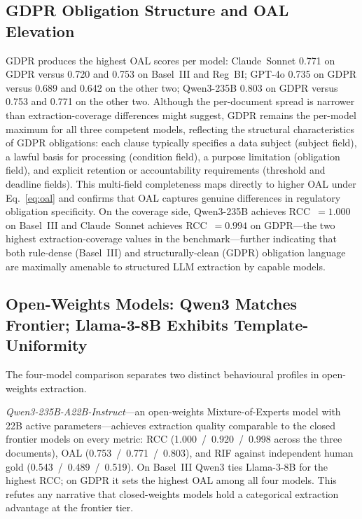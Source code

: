 \documentclass{article}
\begin{document}
\subsection{GDPR Obligation Structure and OAL Elevation}

GDPR produces the highest OAL scores per model:
Claude~Sonnet 0.771 on GDPR versus 0.720 and 0.753 on Basel~III and
Reg~BI; GPT-4o 0.735 on GDPR versus 0.689 and 0.642 on the other two;
Qwen3-235B 0.803 on GDPR versus 0.753 and 0.771 on the other two.
Although the per-document spread is narrower than extraction-coverage
differences might suggest, GDPR remains the per-model maximum for all
three competent models, reflecting the structural characteristics of
GDPR obligations: each clause typically specifies a data subject
(subject field), a lawful basis for processing (condition field), a
purpose limitation (obligation field), and explicit retention or
accountability requirements (threshold and deadline fields).
This multi-field completeness maps directly to higher OAL under
Eq.~\ref{eq:oal} and confirms that OAL captures genuine differences
in regulatory obligation specificity.
On the coverage side, Qwen3-235B achieves RCC~$= 1.000$ on Basel~III
and Claude~Sonnet achieves RCC~$= 0.994$ on GDPR---the two highest
extraction-coverage values in the benchmark---further indicating that
both rule-dense (Basel~III) and structurally-clean (GDPR)
obligation language are maximally amenable to structured LLM
extraction by capable models.

\subsection{Open-Weights Models: Qwen3 Matches Frontier;
Llama-3-8B Exhibits Template-Uniformity}
\label{sec:openweight}

The four-model comparison separates two distinct behavioural
profiles in open-weights extraction.

\emph{Qwen3-235B-A22B-Instruct}---an open-weights Mixture-of-Experts
model with 22B active parameters---achieves extraction quality
comparable to the closed frontier models on every metric: RCC
(1.000~/~0.920~/~0.998 across the three documents), OAL
(0.753~/~0.771~/~0.803), and RIF against independent human gold
(0.543~/~0.489~/~0.519). On Basel~III Qwen3 ties Llama-3-8B for the
highest RCC; on GDPR it sets the highest OAL among all four models.
This refutes any narrative that closed-weights models hold a
categorical extraction advantage at the frontier tier.
\end{document}
